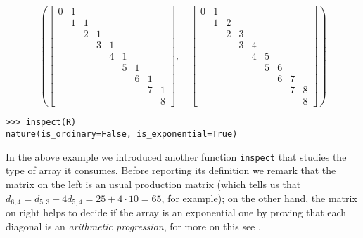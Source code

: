 \begin{example}
\begin{displaymath}
\left ( \left[\begin{matrix}0 & 1 &   &   &   &   &   &   &  \\  & 1 & 1 &   &   &   &   &   &  \\  &   & 2 & 1 &   &   &   &   &  \\  &   &   & 3 & 1 &   &   &   &  \\  &   &   &   & 4 & 1 &   &   &  \\  &   &   &   &   & 5 & 1 &   &  \\  &   &   &   &   &   & 6 & 1 &  \\  &   &   &   &   &   &   & 7 & 1\\  &   &   &   &   &   &   &   & 8\end{matrix}\right], \quad \left[\begin{matrix}0 & 1 &   &   &   &   &   &   &  \\  & 1 & 2 &   &   &   &   &   &  \\  &   & 2 & 3 &   &   &   &   &  \\  &   &   & 3 & 4 &   &   &   &  \\  &   &   &   & 4 & 5 &   &   &  \\  &   &   &   &   & 5 & 6 &   &  \\  &   &   &   &   &   & 6 & 7 &  \\  &   &   &   &   &   &   & 7 & 8\\  &   &   &   &   &   &   &   & 8\end{matrix}\right]\right )
\end{displaymath}
\begin{verbatim}
>>> inspect(R)
nature(is_ordinary=False, is_exponential=True)
\end{verbatim}
\end{example}
In the above example we introduced another function \verb|inspect| that studies
the type of array it consumes. Before reporting its definition we remark that
the matrix on the left is an usual production matrix (which tells us that
$d_{6,4} = d_{5,3} + 4d_{5,4} = 25 + 4\cdot 10 = 65$, for example); on the
other hand, the matrix on right helps to decide if the array is an exponential
one by proving that each diagonal is an \textit{arithmetic progression}, for
more on this see \citep{barry2017riordan}.
\inputminted[baselinestretch=0.8,stripnl=false,firstline=183, lastline=209]
    {python}{deps/simulation-methods/src/sequences.py}

